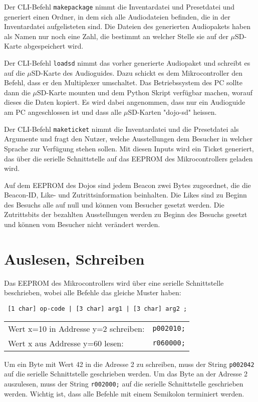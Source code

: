 Der CLI-Befehl \texttt{makepackage} nimmt die Inventardatei und Presetdatei und generiert einen Ordner, in dem sich alle Audiodateien befinden, die in der Inventardatei aufgelisteten sind.
Die Dateien des generierten Audiopakets haben als Namen nur noch eine Zahl, die bestimmt an welcher Stelle sie auf der $\mu$SD-Karte abgespeichert wird.

Der CLI-Befehl \texttt{loadsd} nimmt das vorher generierte Audiopaket und schreibt es auf die $\mu$SD-Karte des Audioguides.
Dazu schickt es dem Mikrocontroller den Befehl, dass er den Multiplexer umschaltet.
Das Betriebssystem des PC sollte dann die $\mu$SD-Karte mounten und dem Python Skript verfügbar machen, worauf dieses die Daten kopiert.
Es wird dabei angenommen, dass nur ein Audioguide am PC angeschlossen ist und dass alle $\mu$SD-Karten "dojo-sd" heissen.

Der CLI-Befehl \texttt{maketicket} nimmt die Inventardatei und die Presetdatei als Argumente und fragt den Nutzer, welche Ausstellungen dem Besucher in welcher Sprache zur Verfügung stehen sollen. 
Mit diesen Inputs wird ein Ticket generiert, das über die serielle Schnittstelle auf das EEPROM des Mikrocontrollers geladen wird.

Auf dem EEPROM des Dojos sind jedem Beacon zwei Bytes zugeordnet, die die Beacon-ID, Like- und Zutrittsinformation beinhalten.
Die Likes sind zu Beginn des Besuchs alle auf null und können vom Besucher gesetzt werden.
Die Zutrittsbits der bezahlten Ausstellungen werden zu Beginn des Besuchs gesetzt und können vom Besucher nicht verändert werden.


\section{Auslesen, Schreiben}
Das EEPROM des Mikrocontrollers wird über eine serielle Schnittstelle beschrieben, wobei alle Befehle das gleiche Muster haben:
\begin{verbatim} [1 char] op-code | [3 char] arg1 | [3 char] arg2 ; \end{verbatim}
\begin{table}[h]
	\begin{tabular}{lr}
		Wert x=10 in Addresse y=2 schreiben: & \texttt{p002010;} \\
		Wert x aus Addresse y=60 lesen:      & \texttt{r060000;} \\
	\end{tabular}
\end{table}
Um ein Byte mit Wert 42 in die Adresse 2 zu schreiben, muss der String \texttt{p002042} auf die serielle Schnittstelle geschrieben werden.
Um das Byte an der Adresse 2 auszulesen, muss der String \texttt{r002000;} auf die serielle Schnittstelle geschrieben werden.
Wichtig ist, dass alle Befehle mit einem Semikolon terminiert werden.

